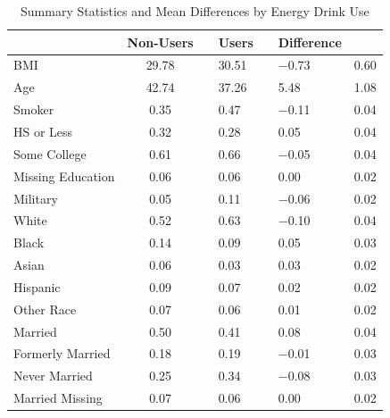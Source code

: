 \begin{table}[htbp]\centering
\def\sym#1{\ifmmode^{#1}\else\(^{#1}\)\fi}
\caption{Summary Statistics and Mean Differences by Energy Drink Use}
\label{tab:stacked_summary}
\begin{tabular}{l*{1}{c}}
\toprule
 & Non-Users & & Users & & Difference & \\
\midrule
BMI & 29.78 & & 30.51 & & $-$0.73 & 0.60 \\
Age & 42.74 & & 37.26 & & 5.48 & 1.08 \\
Smoker & 0.35 & & 0.47 & & $-$0.11 & 0.04 \\
HS or Less & 0.32 & & 0.28 & & 0.05 & 0.04 \\
Some College & 0.61 & & 0.66 & & $-$0.05 & 0.04 \\
Missing Education & 0.06 & & 0.06 & & 0.00 & 0.02 \\
Military & 0.05 & & 0.11 & & $-$0.06 & 0.02 \\
White & 0.52 & & 0.63 & & $-$0.10 & 0.04 \\
Black & 0.14 & & 0.09 & & 0.05 & 0.03 \\
Asian & 0.06 & & 0.03 & & 0.03 & 0.02 \\
Hispanic & 0.09 & & 0.07 & & 0.02 & 0.02 \\
Other Race & 0.07 & & 0.06 & & 0.01 & 0.02 \\
Married & 0.50 & & 0.41 & & 0.08 & 0.04 \\
Formerly Married & 0.18 & & 0.19 & & $-$0.01 & 0.03 \\
Never Married & 0.25 & & 0.34 & & $-$0.08 & 0.03 \\
Married Missing & 0.07 & & 0.06 & & 0.00 & 0.02 \\
\bottomrule
\end{tabular}
\end{table}
